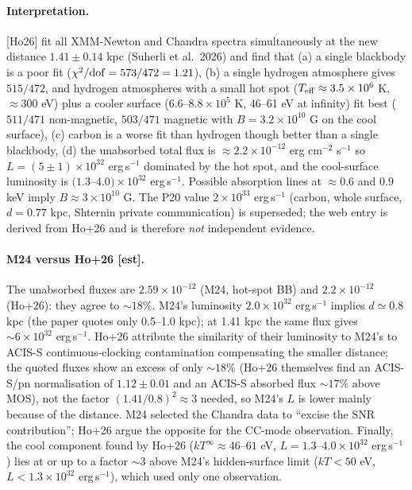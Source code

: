 \documentclass[11pt,a4paper]{article}
\newcommand{\src}[1]{\textsf{[#1]}}
\begin{document}
\paragraph{Interpretation.} \src{Ho26} fit all XMM-Newton and Chandra spectra simultaneously at the new distance $1.41\pm0.14$ kpc (Suherli et al.\ 2026) and find that (a) a single blackbody is a poor fit ($\chi^2/{\rm dof}=573/472=1.21$), (b) a single hydrogen atmosphere gives $515/472$, and hydrogen atmospheres with a small hot spot ($T_{\rm eff}\approx3.5\times10^6$ K, $\approx300$ eV) plus a cooler surface ($6.6$--$8.8\times10^5$ K, 46--61 eV at infinity) fit best ($511/471$ non-magnetic, $503/471$ magnetic with $B=3.2\times10^{10}$ G on the cool surface), (c) carbon is a worse fit than hydrogen though better than a single blackbody, (d) the unabsorbed total flux is $\approx2.2\times10^{-12}$ erg cm$^{-2}$ s$^{-1}$ so $L=(5\pm1)\times10^{32}$ erg\,s$^{-1}$ dominated by the hot spot, and the cool-surface luminosity is $(1.3$--$4.0)\times10^{32}$ erg\,s$^{-1}$. Possible absorption lines at $\approx0.6$ and $0.9$ keV imply $B\approx3\times10^{10}$ G. The P20 value $2\times10^{33}$ erg\,s$^{-1}$ (carbon, whole surface, $d=0.77$ kpc, Shternin private communication) is superseded; the web entry is derived from Ho+26 and is therefore \emph{not} independent evidence.

\paragraph{M24 versus Ho+26 \src{est}.} The unabsorbed fluxes are $2.59\times10^{-12}$ (M24, hot-spot BB) and $2.2\times10^{-12}$ (Ho+26): they agree to $\sim18\%$. M24's luminosity $2.0\times10^{32}$ erg\,s$^{-1}$ implies $d\simeq0.8$ kpc (the paper quotes only 0.5--1.0 kpc); at 1.41 kpc the same flux gives $\sim6\times10^{32}$ erg\,s$^{-1}$. Ho+26 attribute the similarity of their luminosity to M24's to ACIS-S continuous-clocking contamination compensating the smaller distance; the quoted fluxes show an excess of only $\sim18\%$ (Ho+26 themselves find an ACIS-S/pn normalisation of $1.12\pm0.01$ and an ACIS-S absorbed flux $\sim17\%$ above MOS), not the factor $(1.41/0.8)^2\approx3$ needed, so M24's $L$ is lower mainly because of the distance. M24 selected the Chandra data to ``excise the SNR contribution''; Ho+26 argue the opposite for the CC-mode observation. Finally, the cool component found by Ho+26 ($kT^\infty\approx46$--$61$ eV, $L=1.3$--$4.0\times10^{32}$ erg\,s$^{-1}$) lies at or up to a factor $\sim3$ above M24's hidden-surface limit ($kT<50$ eV, $L<1.3\times10^{32}$ erg\,s$^{-1}$), which used only one observation.
\end{document}

